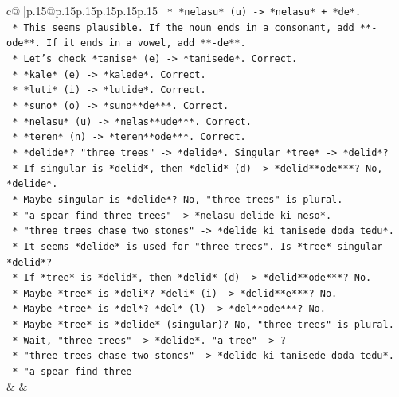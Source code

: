 \documentclass{article}
\begin{document}
{\begin{supertabular}{c@{$\;$}|p{.15\linewidth}@{}p{.15\linewidth}p{.15\linewidth}p{.15\linewidth}p{.15\linewidth}p{.15\linewidth}}
{{{\texttt{                *   *nelasu* (u) {-}> *nelasu* + *de*.} \\
\texttt{            *   This seems plausible. If the noun ends in a consonant, add **{-}ode**. If it ends in a vowel, add **{-}de**.} \\
\texttt{            *   Let's check *tanise* (e) {-}> *tanisede*. Correct.} \\
\texttt{            *   *kale* (e) {-}> *kalede*. Correct.} \\
\texttt{            *   *luti* (i) {-}> *lutide*. Correct.} \\
\texttt{            *   *suno* (o) {-}> *suno**de***. Correct.} \\
\texttt{            *   *nelasu* (u) {-}> *nelas**ude***. Correct.} \\
\texttt{            *   *teren* (n) {-}> *teren**ode***. Correct.} \\
\texttt{            *   *delide*? "three trees" {-}> *delide*. Singular *tree* {-}> *delid*?} \\
\texttt{                *   If singular is *delid*, then *delid* (d) {-}> *delid**ode***? No, *delide*.} \\
\texttt{                *   Maybe singular is *delide*? No, "three trees" is plural.} \\
\texttt{                *   "a spear find three trees" {-}> *nelasu delide ki neso*.} \\
\texttt{                *   "three trees chase two stones" {-}> *delide ki tanisede doda tedu*.} \\
\texttt{                *   It seems *delide* is used for "three trees". Is *tree* singular *delid*?} \\
\texttt{                *   If *tree* is *delid*, then *delid* (d) {-}> *delid**ode***? No.} \\
\texttt{                *   Maybe *tree* is *deli*? *deli* (i) {-}> *delid**e***? No.} \\
\texttt{                *   Maybe *tree* is *del*? *del* (l) {-}> *del**ode***? No.} \\
\texttt{                *   Maybe *tree* is *delide* (singular)? No, "three trees" is plural.} \\
\texttt{                *   Wait, "three trees" {-}> *delide*. "a tree" {-}> ?} \\
\texttt{                *   "three trees chase two stones" {-}> *delide ki tanisede doda tedu*.} \\
\texttt{                *   "a spear find three} \\
            }
        }
    }
    & & \\ \\


\end{supertabular}}
\end{document}
